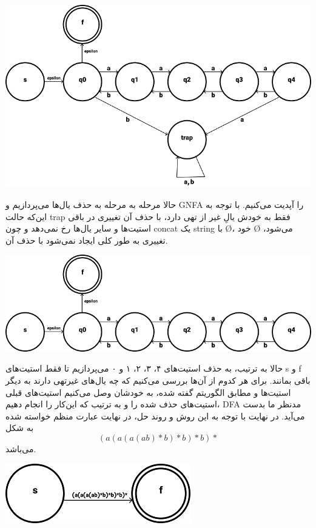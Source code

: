 \begin{center}
	\includegraphics{DFA12}
\end{center}

حالا مرحله به مرحله به حذف یال‌ها می‌پردازیم و GNFA را آپدیت می‌کنیم. با توجه به این‌که حالت trap فقط به خودش یالِ غیر از تهی دارد، با حذف آن تغییری در باقی استیت‌ها و سایر یال‌ها رخ نمی‌دهد و چون concat یک string با Ø، خود Ø می‌شود، تغییری به طور کلی ایجاد نمی‌شود با حذف آن.

\begin{center}
	\includegraphics{DFA13}
\end{center}

حالا به ترتیب، به حذف استیت‌های ۴، ۳، ۲، ۱ و ۰ می‌پردازیم تا فقط استیت‌های s و f باقی بمانند. برای هر کدوم از آن‌ها بررسی می‌کنیم که چه یال‌های غیرتهی دارند به دیگر استیت‌ها و مطابق الگوریتم گفته شده، به خودشان وصل می‌کنیم استیت‌های قبلی استیت‌های حذف شده را و به ترتیب که این‌کار را انجام دهیم، DFA مدنظر ما بدست می‌آید.
در نهایت با توجه به این روش و روند حل، در نهایت عبارت منظم خواسته شده به شکل 
$$ (a(a(a(ab)*b)*b)*b)*$$
می‌باشد.

\begin{center}
	\includegraphics{DFA14}
\end{center}


